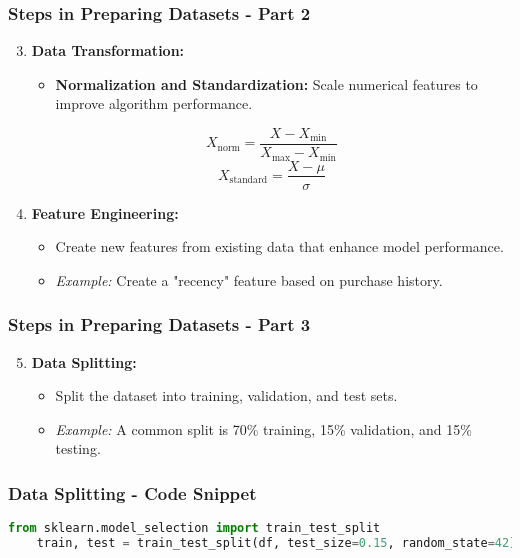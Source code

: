 \documentclass[aspectratio=169]{beamer}
\begin{document}
\begin{frame}
    \frametitle{Steps in Preparing Datasets - Part 2}
    \begin{enumerate}
        \setcounter{enumi}{2} %
        \item \textbf{Data Transformation:}
        \begin{itemize}
            \item \textbf{Normalization and Standardization:} Scale numerical features to improve algorithm performance.
        \end{itemize}
        \begin{equation}
            X_{\text{norm}} = \frac{X - X_{\text{min}}}{X_{\text{max}} - X_{\text{min}}}
        \end{equation}
        \begin{equation}
            X_{\text{standard}} = \frac{X - \mu}{\sigma}
        \end{equation}
        
        \item \textbf{Feature Engineering:}
        \begin{itemize}
            \item Create new features from existing data that enhance model performance.
            \item \textit{Example:} Create a "recency" feature based on purchase history.
        \end{itemize}
    \end{enumerate}
\end{frame}

\begin{frame}
    \frametitle{Steps in Preparing Datasets - Part 3}
    \begin{enumerate}
        \setcounter{enumi}{4} %
        \item \textbf{Data Splitting:}
        \begin{itemize}
            \item Split the dataset into training, validation, and test sets.
            \item \textit{Example:} A common split is 70\% training, 15\% validation, and 15\% testing.
        \end{itemize}
    \end{enumerate}
\end{frame}

\begin{frame}[fragile]
    \frametitle{Data Splitting - Code Snippet}
    \begin{lstlisting}[language=Python]
    from sklearn.model_selection import train_test_split
    train, test = train_test_split(df, test_size=0.15, random_state=42)
    \end{lstlisting}
\end{frame}
\end{document}
